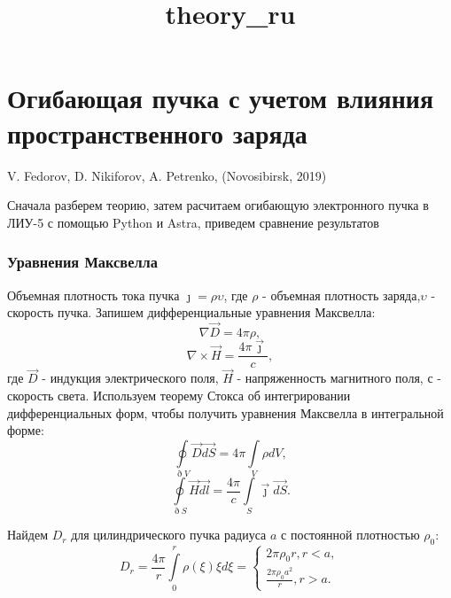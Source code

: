 \documentclass[11pt]{article}
\title{theory\_ru}
\begin{document}
    
    
    \maketitle
    
    

    
    \hypertarget{ux43eux433ux438ux431ux430ux44eux449ux430ux44f-ux43fux443ux447ux43aux430-ux441-ux443ux447ux435ux442ux43eux43c-ux432ux43bux438ux44fux43dux438ux44f-ux43fux440ux43eux441ux442ux440ux430ux43dux441ux442ux432ux435ux43dux43dux43eux433ux43e-ux437ux430ux440ux44fux434ux430}{%
\section{Огибающая пучка с учетом влияния пространственного
заряда}\label{ux43eux433ux438ux431ux430ux44eux449ux430ux44f-ux43fux443ux447ux43aux430-ux441-ux443ux447ux435ux442ux43eux43c-ux432ux43bux438ux44fux43dux438ux44f-ux43fux440ux43eux441ux442ux440ux430ux43dux441ux442ux432ux435ux43dux43dux43eux433ux43e-ux437ux430ux440ux44fux434ux430}}

V. Fedorov, D. Nikiforov, A. Petrenko, (Novosibirsk, 2019)

    Сначала разберем теорию, затем расчитаем огибающую электронного пучка в
ЛИУ-5 с помощью Python и Astra, приведем сравнение результатов

    \hypertarget{ux443ux440ux430ux432ux43dux435ux43dux438ux44f-ux43cux430ux43aux441ux432ux435ux43bux43bux430}{%
\subsubsection{Уравнения
Максвелла}\label{ux443ux440ux430ux432ux43dux435ux43dux438ux44f-ux43cux430ux43aux441ux432ux435ux43bux43bux430}}

    Объемная плотность тока пучка \(\jmath = \rho\upsilon\), где \(\rho\) -
объемная плотность заряда,\(\upsilon\) - скорость пучка. Запишем
дифференциальные уравнения Максвелла: \[
\nabla \vec{D} = 4\pi\rho,
\] \[
\nabla\times \vec{H} = \frac{4\pi\vec{\jmath}}{c},
\] где \(\vec{D}\) - индукция электрического поля, \(\vec{H}\) -
напряженность магнитного поля, \(с\) - скорость света. Используем
теорему Стокса об интегрировании дифференциальных форм, чтобы получить
уравнения Максвелла в интегральной форме: \[
\oint\limits_{\eth V} \vec{D}\vec{dS} = 4\pi\int\limits_V\rho{dV},
\] \[
\oint\limits_{\eth S} \vec{H}\vec{dl} = \frac{4\pi}{c}\int\limits_S\vec{\jmath}\vec{dS}.
\]

    Найдем \(D_r\) для цилиндрического пучка радиуса \(a\) с постоянной
плотностью \(\rho_0\): \[
D_r = \frac{4\pi}{r}\int\limits^r_0\rho(\xi)\xi d\xi = 
\begin{equation*}
 \begin{cases}
   \displaystyle 2\pi\rho_0 r, r < a, 
   \\
   \displaystyle \frac{2\pi\rho_0 a^2}{r}, r > a.
 \end{cases}
\end{equation*}
\]
\end{document}
